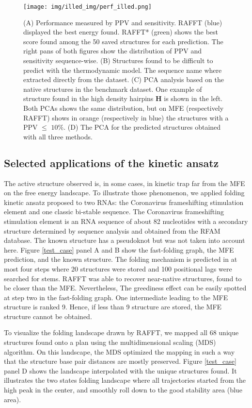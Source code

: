 \documentclass[a4paper,12pt]{article}
\begin{document}
\begin{figure}[htbp]
\centering
\texttt{[image: img/illed\_img/perf\_illed.png]}
\caption{\label{perf_fig}(A) Performance measured by PPV and sensitivity. RAFFT (blue) displayed the best energy found. RAFFT* (green) shows the best score found among the 50 saved structures for each prediction. The right pans of both figures show the distribution of PPV and sensitivity sequence-wise. (B) Structures found to be difficult to predict with the thermodynamic model. The sequence name where extracted directly from the dataset. (C) PCA analysis based on the native structures in the benchmark dataset. One example of structure found in the high density hairpins \textbf{H} is shown in the left. Both PCAs shows the same distribution, but on MFE (respectively RAFFT) shows in orange (respectively in blue) the structures with a PPV \(\leq\) \(10\%\). (D) The PCA for the predicted structures obtained with all three methods.}
\end{figure}

\subsection*{Selected applications of the kinetic ansatz}
\label{sec:org20ac1ca}
The active structure observed is, in some cases, in kinetic trap far from the
MFE on the free energy landscape. To illustrate those phenomenon, we applied
folding kinetic ansatz proposed to two RNAs: the Coronavirus frameshifting
stimulation element and one classic bi-stable sequence. The Coronavirus
frameshifting stimulation element is an RNA sequence of about 82 nucleotides
with a secondary structure determined by sequence analysis and obtained from the
RFAM database. The known structure has a pseudoknot but was not taken into
account here. Figure \ref{test_case} panel A and B show the fast-folding graph,
the MFE prediction, and the known structure. The folding mechanism is predicted
in at most four steps where 20 structures were stored and 100 positional lags
were searched for stems. RAFFT was able to recover near-native structures, found
to be closer than the MFE. Nevertheless, The greediness effect can be easily
spotted at step two in the fast-folding graph. One intermediate leading to the
MFE structure is ranked 9. Hence, if less than 9 structure are stored, the MFE
structure cannot be obtained.

To visualize the folding landscape drawn by RAFFT, we mapped all 68 unique
structures found onto a plan using the multidimensional scaling (MDS) algorithm.
On this landscape, the MDS optimized the mapping in such a way that the
structure base pair distances are mostly preserved. Figure \ref{test_case} panel D
shows the landscape interpolated with the unique structures found. It
illustrates the two states folding landscape where all trajectories started from
the high peak in the center, and smoothly roll down to the good stability area
(blue area).
\end{document}
